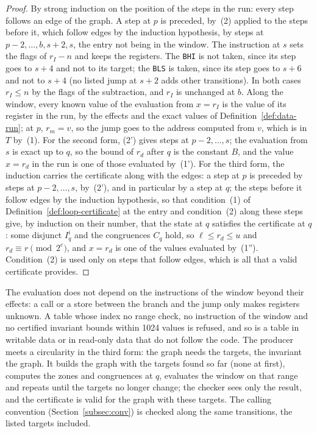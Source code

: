 \documentclass[oneside,english]{amsart}
\numberwithin{equation}{section}
\theoremstyle{plain}
\theoremstyle{definition}
\theoremstyle{plain}
\theoremstyle{plain}
\theoremstyle{remark}
\begin{document}
\begin{proof}
By strong induction on the position of the steps in the run: every step follows an edge of the graph. A step at $p$ is preceded, by~(2) applied to the steps before it, which follow edges by the induction hypothesis, by steps at $p - 2, \dots, b, s + 2, s$, the entry not being in the window. The instruction at $s$ sets the flags of $r_I - n$ and keeps the registers. The \texttt{BHI} is not taken, since its step goes to $s + 4$ and not to its target; the \texttt{BLS} is taken, since its step goes to $s + 6$ and not to $s + 4$ (no listed jump at $s + 2$ adds other transitions). In both cases $r_I \le n$ by the flags of the subtraction, and $r_I$ is unchanged at $b$. Along the window, every known value of the evaluation from $x = r_I$ is the value of its register in the run, by the effects and the exact values of Definition~\ref{def:data-run}; at $p$, $r_m = v$, so the jump goes to the address computed from $v$, which is in $T$ by~(1). For the second form, (2') gives steps at $p - 2, \dots, s$; the evaluation from $s$ is exact up to $q$, so the bound of $r_d$ after $q$ is the constant $B$, and the value $x = r_d$ in the run is one of those evaluated by~(1'). For the third form, the induction carries the certificate along with the edges: a step at $p$ is preceded by steps at $p - 2, \dots, s$, by~(2'), and in particular by a step at $q$; the steps before it follow edges by the induction hypothesis, so that condition~(1) of Definition~\ref{def:loop-certificate} at the entry and condition~(2) along these steps give, by induction on their number, that the state at $q$ satisfies the certificate at $q$: some disjunct $I_q^i$ and the congruences $C_q$ hold, so $\ell \le r_d \le u$ and $r_d \equiv r \pmod{2^e}$, and $x = r_d$ is one of the values evaluated by~(1''). Condition~(2) is used only on steps that follow edges, which is all that a valid certificate provides.
\end{proof}

The evaluation does not depend on the instructions of the window beyond their effects: a call or a store between the branch and the jump only makes registers unknown. A table whose index no range check, no instruction of the window and no certified invariant bounds within 1024 values is refused, and so is a table in writable data or in read-only data that do not follow the code. The producer meets a circularity in the third form: the graph needs the targets, the invariant the graph. It builds the graph with the targets found so far (none at first), computes the zones and congruences at $q$, evaluates the window on that range and repeats until the targets no longer change; the checker sees only the result, and the certificate is valid for the graph with these targets. The calling convention (Section~\ref{subsec:conv}) is checked along the same transitions, the listed targets included.
\end{document}
